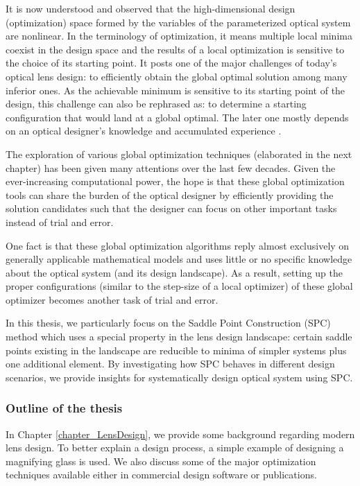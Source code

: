 It is now understood and observed that the high-dimensional design (optimization) space formed by the variables of the parameterized optical system are nonlinear. In the terminology of optimization, it means multiple local minima coexist in the design space and the results of a local optimization is sensitive to the choice of its starting point. It posts one of the major challenges of today's optical lens design: to efficiently obtain the global optimal solution among many inferior ones. As the achievable minimum is sensitive to its starting point of the design, this challenge can also be rephrased as: to determine a starting configuration that would land at a global optimal. The later one mostly depends on an optical designer's knowledge and accumulated experience \cite{LivshitsQA2013}\cite{Shafer1995_moreless}. 

The exploration of various global optimization techniques (elaborated in the next chapter) has been given many attentions over the last few decades. Given the ever-increasing computational power, the hope is that these global optimization tools can share the burden of the optical designer by efficiently providing the solution candidates such that the designer can focus on other important tasks instead of trial and error. 

One fact is that these global optimization algorithms reply almost exclusively on generally applicable mathematical models and uses little or no specific knowledge about the optical system (and its design landscape). As a result, setting up the proper configurations (similar to the step-size of a local optimizer) of these global optimizer becomes another task of trial and error. 

In this thesis, we particularly focus on the Saddle Point Construction (SPC) method which uses a special property in the lens design landscape: certain saddle points existing in the landscape are reducible to minima of simpler systems plus one additional element. By investigating how SPC behaves in different design scenarios, we provide insights for systematically design optical system using SPC. 



\subsubsection{Outline of the thesis}
In Chapter \ref{chapter_LensDesign}, we provide some background regarding modern lens design. To better explain a design process, a simple example of designing a magnifying glass is used. We also discuss some of the major optimization techniques available either in commercial design software or publications. 

